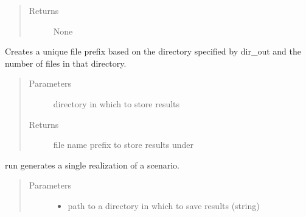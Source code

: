 \documentclass[letterpaper,10pt,english]{sphinxmanual}
\begin{document}
\begin{fulllineitems}
\begin{fulllineitems}
\begin{quote}
\begin{description}
\item[{Returns}] \leavevmode
None

\end{description}\end{quote}

\end{fulllineitems}


\begin{fulllineitems}
\label{\detokenize{index:feast.EmissionSimModules.simulation_classes.Scenario.real_filename}}
Creates a unique file prefix based on the directory specified by dir\_out and the number of files in that
directory.
\begin{quote}\begin{description}
\item[{Parameters}] \leavevmode
{} \textendash{} directory in which to store results

\item[{Returns}] \leavevmode
file name prefix to store results under

\end{description}\end{quote}

\end{fulllineitems}


\begin{fulllineitems}
\label{\detokenize{index:feast.EmissionSimModules.simulation_classes.Scenario.run}}
run generates a single realization of a scenario.
\begin{quote}\begin{description}
\item[{Parameters}] \leavevmode\begin{itemize}
\item {} 
 \textendash{} path to a directory in which to save results (string)


\end{itemize}
\end{description}
\end{quote}
\end{fulllineitems}
\end{fulllineitems}
\end{document}
